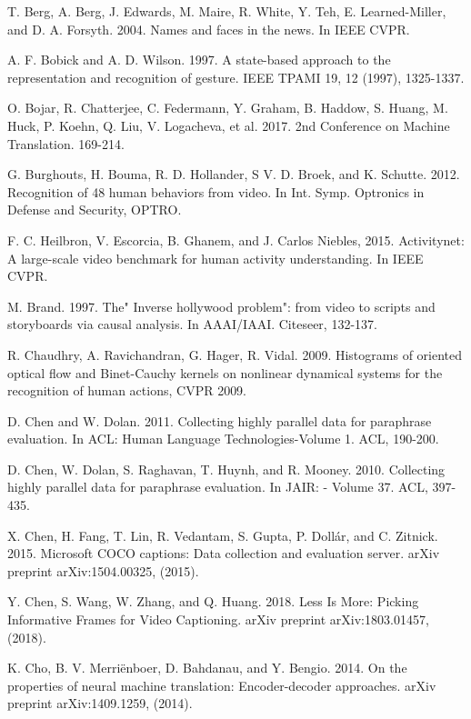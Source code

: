 \documentclass[10pt,journal,compsoc]{IEEEtran}
\begin{document}
\begin{thebibliography}{1}
T. Berg, A. Berg, J. Edwards, M. Maire, R. White, Y. Teh, E. Learned-Miller, and D. A. Forsyth. 2004. Names and faces in the news. In IEEE CVPR.

A. F. Bobick and A. D. Wilson. 1997. A state-based approach to the representation and recognition of gesture. IEEE TPAMI 19, 12 (1997), 1325-1337.

O. Bojar, R. Chatterjee, C. Federmann, Y. Graham, B. Haddow, S. Huang, M. Huck, P. Koehn, Q. Liu, V. Logacheva, et al. 2017. 2nd Conference on Machine Translation. 169-214.

G. Burghouts, H. Bouma, R. D. Hollander, S V. D. Broek, and K. Schutte. 2012. Recognition of 48 human behaviors from video. In Int. Symp. Optronics in Defense and Security, OPTRO.

F. C. Heilbron, V. Escorcia, B. Ghanem, and J. Carlos Niebles, 2015. Activitynet: A large-scale video benchmark for human activity understanding. In IEEE CVPR.

M. Brand. 1997. The" Inverse hollywood problem": from video to scripts and storyboards via causal analysis. In AAAI/IAAI. Citeseer, 132-137. 

R. Chaudhry, A. Ravichandran, G. Hager, R. Vidal. 2009. Histograms of oriented optical flow and Binet-Cauchy kernels on nonlinear dynamical systems for the recognition of human actions, CVPR 2009.


D. Chen and W. Dolan. 2011. Collecting highly parallel data for paraphrase evaluation. In ACL: Human Language Technologies-Volume 1. ACL, 190-200.

D. Chen, W. Dolan, S. Raghavan, T. Huynh, and R. Mooney. 2010. Collecting highly parallel data for paraphrase evaluation. In JAIR: - Volume 37. ACL, 397-435.

X. Chen, H. Fang, T. Lin, R. Vedantam, S. Gupta, P. Dollár, and C. Zitnick. 2015. Microsoft COCO captions: Data collection and evaluation server. arXiv preprint arXiv:1504.00325, (2015).

Y. Chen, S. Wang, W. Zhang, and Q. Huang. 2018. Less Is More: Picking Informative Frames for Video Captioning. arXiv preprint arXiv:1803.01457, (2018).

K. Cho, B. V. Merriënboer, D. Bahdanau, and Y. Bengio. 2014. On the properties of neural machine translation: Encoder-decoder approaches. arXiv preprint arXiv:1409.1259, (2014).


\end{thebibliography}
\end{document}
